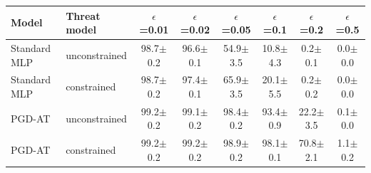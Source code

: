 \begin{tabular}{llcccccc}
\toprule
Model & Threat model & $\epsilon$=0.01 & $\epsilon$=0.02 & $\epsilon$=0.05 & $\epsilon$=0.1 & $\epsilon$=0.2 & $\epsilon$=0.5 \\
\midrule
Standard MLP & unconstrained & 98.7$\pm$0.2 & 96.6$\pm$0.1 & 54.9$\pm$3.5 & 10.8$\pm$4.3 & 0.2$\pm$0.1 & 0.0$\pm$0.0 \\
Standard MLP & constrained & 98.7$\pm$0.2 & 97.4$\pm$0.1 & 65.9$\pm$3.5 & 20.1$\pm$5.5 & 0.2$\pm$0.2 & 0.0$\pm$0.0 \\
PGD-AT & unconstrained & 99.2$\pm$0.2 & 99.1$\pm$0.2 & 98.4$\pm$0.2 & 93.4$\pm$0.9 & 22.2$\pm$3.5 & 0.1$\pm$0.0 \\
PGD-AT & constrained & 99.2$\pm$0.2 & 99.2$\pm$0.2 & 98.9$\pm$0.2 & 98.1$\pm$0.1 & 70.8$\pm$2.1 & 1.1$\pm$0.2 \\
\bottomrule
\end{tabular}